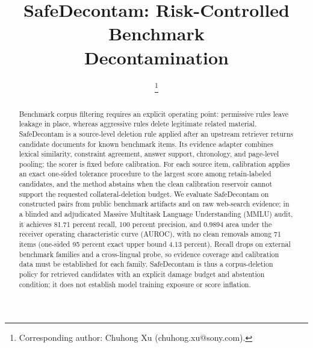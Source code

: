 \documentclass[conference]{IEEEtran}
\begin{document}
\title{SafeDecontam: Risk-Controlled Benchmark\\Decontamination}

\author{
\thanks{Corresponding author: Chuhong Xu (chuhong.xu@sony.com).}
\and
{}
\and
{}
}

\maketitle

\begin{abstract}
Benchmark corpus filtering requires an explicit operating point: permissive rules leave leakage in place, whereas aggressive rules delete legitimate related material. SafeDecontam is a source-level deletion rule applied after an upstream retriever returns candidate documents for known benchmark items. Its evidence adapter combines lexical similarity, constraint agreement, answer support, chronology, and page-level pooling; the scorer is fixed before calibration. For each source item, calibration applies an exact one-sided tolerance procedure to the largest score among retain-labeled candidates, and the method abstains when the clean calibration reservoir cannot support the requested collateral-deletion budget. We evaluate SafeDecontam on constructed pairs from public benchmark artifacts and on raw web-search evidence; in a blinded and adjudicated Massive Multitask Language Understanding (MMLU) audit, it achieves 81.71 percent recall, 100 percent precision, and 0.9894 area under the receiver operating characteristic curve (AUROC), with no clean removals among 71 items (one-sided 95 percent exact upper bound 4.13 percent). Recall drops on external benchmark families and a cross-lingual probe, so evidence coverage and calibration data must be established for each family. SafeDecontam is thus a corpus-deletion policy for retrieved candidates with an explicit damage budget and abstention condition; it does not establish model training exposure or score inflation.
\end{abstract}
\end{document}
